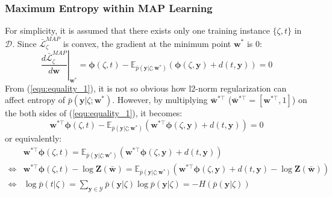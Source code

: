 \subsubsection{Maximum Entropy within MAP Learning}
For simplicity, it is assumed that there exists only one training instance $\{\zeta,t\}$ in $\mathcal{D}$.  
Since $\bar{\mathcal{L}}^{MAP}_\zeta$ is convex, the gradient at the minimum point $\mathbf{w}^*$ is 0: 
\begin{equation}
    \left.\frac{d \bar{\mathcal{L}}^{MAP}_\zeta}{d \mathbf{w}}\right|_{\mathbf{w}^*}=\boldsymbol{\phi}(\zeta, t)-\mathbb{E}_{\bar p(\mathbf{y}|\zeta;\mathbf{w}^*)} \left(\boldsymbol{\phi}(\zeta,\mathbf{y})+d(t,\mathbf{y})\right)=0
    \label{equ:equality_1}
\end{equation}
From (\ref{equ:equality_1}), it is not so obvious how l2-norm regularization can affect entropy of $\bar p(\mathbf{y}|\zeta;\mathbf{w}^*)$.    
However, by multiplying $\bar{\mathbf{w}}^{*\top}$ ($\bar{\mathbf{w}}^{*\top}=[\mathbf{w}^{*\top},1]$) on the both sides of (\ref{equ:equality_1}), it becomes: 
\begin{equation}
    \mathbf{w}^{*\top}\boldsymbol{\phi}(\zeta, t)-\mathbb{E}_{\bar p(\mathbf{y}|\zeta; \mathbf{w}^*)} \left(\mathbf{w}^{*\top} \boldsymbol{\phi}(\zeta,\mathbf{y})+d(t,\mathbf{y})\right)=0 
\end{equation}
or equivalently:
\begin{equation}
    \begin{array}{ll}
                   & \mathbf{w}^{*\top}\boldsymbol{\phi}(\zeta, t)=\mathbb{E}_{\bar p(\mathbf{y}|\zeta; \mathbf{w}^*)} \left(\mathbf{w}^{*\top}\boldsymbol{\phi}(\zeta,\mathbf{y})+d(t,\mathbf{y})\right)\\ 
    \Leftrightarrow& \mathbf{w}^{*\top}\boldsymbol{\phi}(\zeta, t)-\log \mathbf{Z}(\bar{\mathbf{w}})= \mathbb{E}_{\bar p(\mathbf{y}|\zeta; \mathbf{w}^*)}(\mathbf{w}^{*\top} \boldsymbol{\phi}(\zeta,\mathbf{y})+d(t,\mathbf{y})-\log \mathbf{Z}(\bar{\mathbf{w}})) \\ 
    \Leftrightarrow& \log \bar p(t|\zeta) = \sum_{\mathbf{y}\in\mathcal{Y}} \bar p(\mathbf{y}|\zeta)\log \bar p(\mathbf{y}|\zeta)=-H(\bar p(\mathbf{y}|\zeta)) 
    \end{array}
    \label{equ:entropy}
\end{equation}
